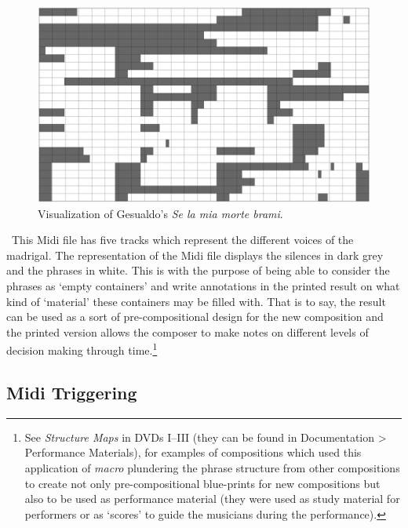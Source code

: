 \begin{figure}[htbp] %
   \centering
   \includegraphics[width=16cm]{chapter5/midi_gesualdo.tif} %
   \caption{Visualization of Gesualdo's \emph{Se la mia morte brami}.}
   \label{fig:example}
\end{figure}\
This Midi file has five tracks which represent the different voices of the madrigal. The representation of the Midi file displays the silences in dark grey and the phrases in white. This is with the purpose of being able to consider the phrases as `empty containers' and write annotations in the printed result on what kind of `material' these containers may be filled with. That is to say, the result can be used as a sort of pre-compositional design for the new composition and the printed version allows the composer to make notes on different levels of decision making through time.\footnote{See \emph{Structure Maps} in DVDs I--III (they can be found in Documentation \tiny \textgreater \footnotesize \hspace{0pt} Performance Materials), for examples of compositions which used this application of \emph{macro} plundering the phrase structure from other compositions to create not only pre-compositional blue-prints for new compositions but also to be used as performance material (they were used as study material for performers or as `scores' to guide the musicians during the performance).}

\subsection{Midi Triggering}


